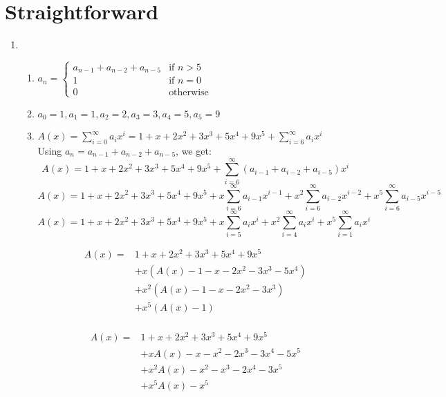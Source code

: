 \documentclass[a4paper]{article}
\begin{document}
\section{Straightforward}
    \begin{enumerate}

    \item \begin{enumerate}
        \item $a_n = \begin{cases}
            a_{n-1} + a_{n-2} + a_{n-5} & \text{if } n > 5 \\
            1 & \text{if } n = 0 \\
            0 & \text{otherwise}
        \end{cases}
        $ \\

        \item $a_0 = 1, a_1 = 1, a_2 = 2, a_3 = 3, a_4 = 5, a_5 = 9$ \\

        \item $A(x) = \sum_{i=0}^{\infty} a_i x^i = 1 + x + 2x^2 + 3x^3 + 5x^4 + 9x^5 + \sum_{i=6}^{\infty} a_ix^i$ \\

        Using $a_n = a_{n-1} + a_{n-2} + a_{n-5}$, we get:
        \[A(x) = 1 + x + 2x^2 + 3x^3 + 5x^4 + 9x^5 + \sum_{i=6}^{\infty} (a_{i-1} + a_{i-2} + a_{i-5})x^i\]
        \[A(x) = 1 + x + 2x^2 + 3x^3 + 5x^4 + 9x^5 + x\sum_{i=6}^{\infty} a_{i-1}x^{i-1} + x^2\sum_{i=6}^{\infty} a_{i-2}x^{i-2} + x^5\sum_{i=6}^{\infty} a_{i-5}x^{i-5}\]
        \[A(x) = 1 + x + 2x^2 + 3x^3 + 5x^4 + 9x^5 + x\sum_{i=5}^{\infty} a_{i}x^{i} + x^2\sum_{i=4}^{\infty} a_{i}x^{i} + x^5\sum_{i=1}^{\infty} a_{i}x^{i}\]

        \[
            \begin{split}
                A(x) =  & 1 + x + 2x^2 + 3x^3 + 5x^4 + 9x^5 \\
                & + x(A(x) - 1 - x - 2x^2 - 3x^3 - 5x^4) \\
                & + x^2(A(x) - 1 - x - 2x^2 - 3x^3) \\
                & + x^5(A(x) - 1) \\
            \end{split}
        \]

        \[
            \begin{split}
                A(x) =  & 1 + x + 2x^2 + 3x^3 + 5x^4 + 9x^5 \\
                & + xA(x) - x - x^2 - 2x^3 - 3x^4 - 5x^5 \\
                & + x^2A(x) - x^2 - x^3 - 2x^4 - 3x^5 \\
                & + x^5A(x) - x^5 \\
            \end{split}
        \]


\end{enumerate}
\end{enumerate}
\end{document}
